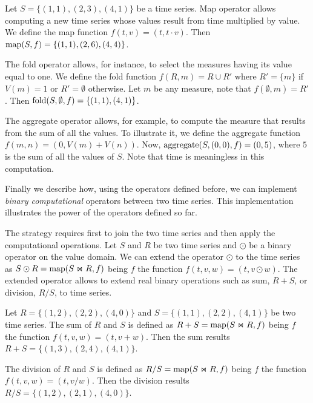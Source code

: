 \begin{example}
\label{ex:computational-operators}
Let $S=\{(1,1),(2,3),(4,1)\}$ be a time series.  Map operator allows
computing a new time series whose values result from time multiplied
by value.  We define the map function $f(t,v)=(t,t\cdot v)$. Then
$\operatorname*{map}(S,f)=\{(1,1),(2,6),(4,4)\}$.
%

The fold operator allows, for instance, to select the measures having
its value equal to one.  We define the fold function $f(R,m)=R\cup R'$
where $R'=\{m\}$ if $V(m)=1$ or $R'=\emptyset$ otherwise. Let $m$ be
any measure, note that $f(\emptyset,m)= R'$. Then
$\operatorname*{fold}(S,\emptyset,f)=\{(1,1),(4,1)\}$.


The aggregate operator allows, for example, to compute the measure
that results from the sum of all the values.  To illustrate it, we
define the aggregate function $f(m,n)=(0,V(m)+V(n))$. Now,
$\operatorname*{aggregate}(S,(0,0),f) = (0,5)$, where $5$ is the sum of all the values of
$S$. Note that time is meaningless in this computation.
\end{example}




Finally we describe how, using the operators defined before, we can
implement \emph{binary computational} operators between two time
series. This implementation illustrates the power of the operators
defined so far.

The strategy requires first to join the two time series and then apply
the computational operations. Let $S$ and $R$ be two time series and
$\odot$ be a binary operator on the value domain. We can extend the
operator $\odot$ to the time series as $S\odot R=\operatorname*{map}(S\Join R, f)$
being $f$ the function $f(t,v,w)=(t,v\odot w)$. The extended operator
allows to extend real binary operations such as sum, $R+S$, or
division, $R/S$, to time series.

\begin{example}
  \label{ex:model:sum}
  Let $R=\{(1,2), (2,2), (4,0)\}$ and $S=\{(1,1), (2,2), (4,1)\}$ be
  two time series.  The sum of $R$ and $S$ is defined as
  $R+S=\operatorname*{map}(S\Join R, f)$ being $f$ the function $f(t,v,w)=(t,v+ w)$.
  Then the sum results $R+S= \{(1,3), (2,4), (4,1)\}$.
  
  The division of $R$ and $S$ is defined as
  $R/S=\operatorname*{map}(S\Join R, f)$ being $f$ the function $f(t,v,w)=(t,v/w)$.
  Then the division results $R/S= \{(1,2), (2,1), (4,0)\}$.
\end{example}

